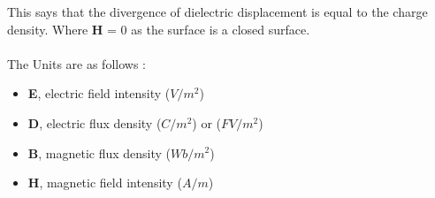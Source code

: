 This says that the divergence of dielectric displacement is  equal to the charge density. Where \textbf{H} = 0 as the surface is a closed surface.\\
\\
\noindent
The Units are as follows :

\begin{itemize}
    \item \textbf{E}, electric field intensity ($V/m^2$)
    \item \textbf{D}, electric flux density ($C/m^2$) or ($FV/m^2$)
    \item \textbf{B}, magnetic flux density ($Wb/m^2$)
    \item \textbf{H}, magnetic field intensity ($A/m$)
\end{itemize}